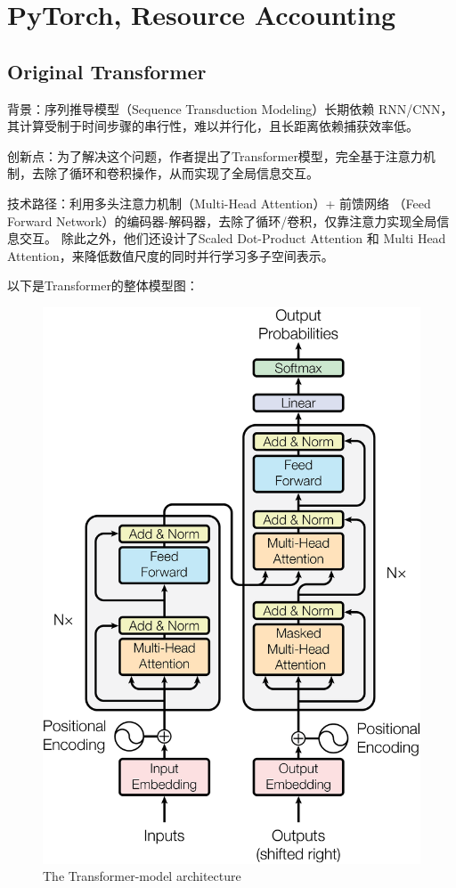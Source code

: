
\vspace{-10cm}
\chapter{PyTorch, Resource Accounting}

\vspace{-2cm}


{\chaptoc\noindent\begin{minipage}[inner sep=0,outer sep=0]{0.9\linewidth}\section{Original Transformer}\end{minipage}}

背景：序列推导模型（Sequence Transduction Modeling）长期依赖 RNN/CNN，其计算受制于时间步骤的串行性，难以并行化，且长距离依赖捕获效率低。

创新点：为了解决这个问题，作者提出了Transformer模型，完全基于注意力机制，去除了循环和卷积操作，从而实现了全局信息交互。

技术路径：利用多头注意力机制（Multi-Head Attention）+ 前馈网络 （Feed Forward Network）的编码器-解码器，去除了循环/卷积，仅靠注意力实现全局信息交互。 除此之外，他们还设计了Scaled Dot-Product Attention 和 Multi Head Attention，来降低数值尺度的同时并行学习多子空间表示。


以下是Transformer的整体模型图：

\begin{figure}[htbp]
  \centering
  \includegraphics[width=0.5\linewidth]{figs/lec2/lec2.01.png}
  \caption{The Transformer-model architecture}
  \label{fig: Transformer architecture}
\end{figure}

